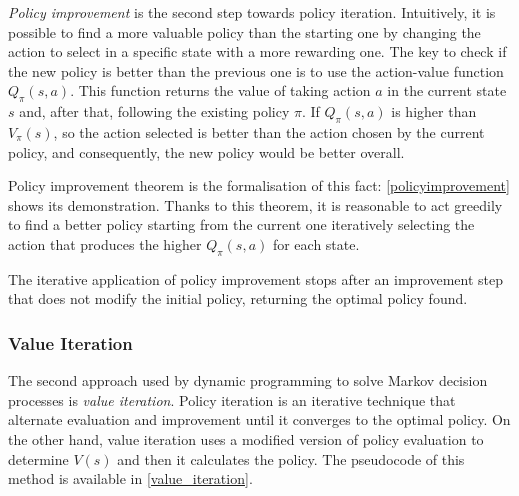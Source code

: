 \textit{Policy improvement} is the second step towards policy iteration.
Intuitively, it is possible to find a more valuable policy than the starting one by changing the action to select in a specific state with a more rewarding one.
The key to check if the new policy is better than the previous one is to use the action-value function $Q_\pi(s,a)$.
This function returns the value of taking action $a$ in the current state $s$ and, after that, following the existing policy $\pi$.
If $Q_\pi(s,a)$ is higher than $V_\pi(s)$, so the action selected is better than the action chosen by the current policy, and consequently, the new policy would be better overall.

Policy improvement theorem is the formalisation of this fact: \vref{policyimprovement} shows its demonstration.
Thanks to this theorem, it is reasonable to act greedily to find a better policy starting from the current one iteratively selecting the action that produces the higher  $Q_\pi(s, a)$ for each state.


The iterative application of policy improvement stops after an improvement step that does not modify the initial policy, returning the optimal policy found.

\subsubsection{Value Iteration}

The second approach used by dynamic programming to solve Markov decision processes is \textit{value iteration}.
Policy iteration is an iterative technique that alternate evaluation and improvement until it converges to the optimal policy.
On the other hand, value iteration uses a modified version of policy evaluation to determine $V(s)$ and then it calculates the policy.
The pseudocode of this method is available in \vref{value_iteration}.

